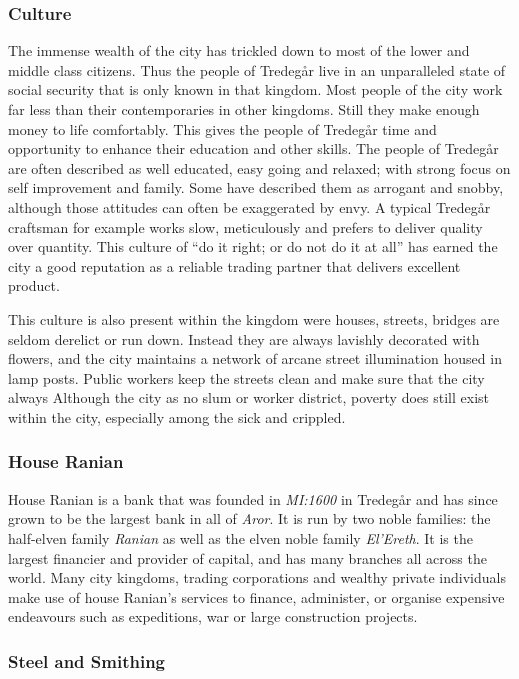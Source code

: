 \subsubsection*{Culture}

The immense wealth of the city has trickled down to most of the lower and middle
class citizens. Thus the people of Tredegår live in an unparalleled state of
social security that is only known in that kingdom. Most people of the city
work far less than their contemporaries in other kingdoms. Still they make
enough money to life comfortably. This gives the people of Tredegår time and
opportunity to enhance their education and other skills. The people of Tredegår
are often described as well educated, easy going and relaxed; with strong focus
on self improvement and family. Some have described them as arrogant and snobby,
although those attitudes can often be exaggerated by envy. A typical Tredegår
craftsman for example works slow, meticulously and prefers to deliver quality
over quantity. This culture of ``do it right; or do not do it at all'' has
earned the city a good reputation as a reliable trading partner that delivers
excellent product.

This culture is also present within the kingdom were houses, streets, bridges
are seldom derelict or run down. Instead they are always lavishly decorated with
flowers, and the city maintains a network of arcane street illumination housed
in lamp posts. Public workers keep the streets clean and make sure that the
city always Although the city as no slum or worker district, poverty does
still exist within the city, especially among the sick and crippled.

\subsubsection*{House Ranian}

House Ranian is a bank that was founded in \emph{MI:1600} in Tredegår and has
since grown to be the largest bank in all of \emph{Aror}. It is run by two noble
families: the half-elven family \emph{Ranian} as well as the elven noble family
\emph{El'Ereth}. It is the largest financier and provider of capital, and has
many branches all across the world. Many city kingdoms, trading corporations
and wealthy private individuals make use of house Ranian's services to finance,
administer, or organise expensive endeavours such as expeditions, war or large
construction projects.

\subsubsection*{Steel and Smithing}

